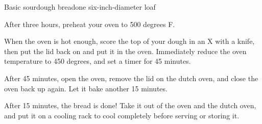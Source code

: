 \documentclass{article}
\begin{document}
\begin{recipe}{Basic sourdough bread}{one six-inch-diameter loaf}
    \begin{step}
      \begin{ingrs}
      \end{ingrs}
      \begin{stepdesc}
        After three hours, preheat your oven to 500 degrees F.
      \end{stepdesc}
    \end{step}
    \begin{step}
      \begin{ingrs}
      \end{ingrs}
      \begin{stepdesc}
        When the oven is hot enough, score the top of your dough in an X with a knife, then put the lid back on and put it in the oven. Immediately reduce the oven temperature to 450 degrees, and set a timer for 45 minutes.
      \end{stepdesc}
    \end{step}
    \begin{step}
      \begin{ingrs}
      \end{ingrs}
      \begin{stepdesc}
        After 45 minutes, open the oven, remove the lid on the dutch oven, and close the oven back up again. Let it bake another 15 minutes.
      \end{stepdesc}
    \end{step}
    \begin{step}
      \begin{ingrs}
      \end{ingrs}
      \begin{stepdesc}
        After 15 minutes, the bread is done! Take it out of the oven and the dutch oven, and put it on a cooling rack to cool completely before serving or storing it.
      \end{stepdesc}
    \end{step}
  \end{recipe}
\end{document}
